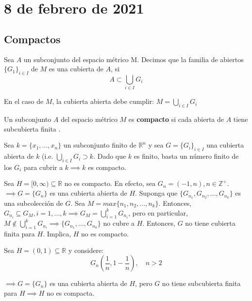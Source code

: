 \section{8 de febrero de 2021}

\subsection{Compactos}
\begin{definition}
Sea $A$ un subconjunto del espacio métrico M. Decimos que la familia de abiertos $\{G_1\}_{i\in I}$ de $M$ es una cubierta de $A$, si
$$A\subset \bigcup_{i\in I}G_i $$
\end{definition}
\begin{remark}
En el caso de $M$, la cubierta abierta debe cumplir: $M=\bigcup_{i\in I}G_i$
\end{remark}

\begin{definition}
Un subconjunto $A$ del espacio métrico $M$ es \textbf{compacto} si cada abierta de $A$ tiene subcubierta finita . 
\end{definition}

\begin{example}
Sea $k=\{x_1,...,x_n\}$ un subconjunto finito de $\mathbb{R}^n$ y sea $G=\{G_i\}_{i\in I}$ una cubierta abierta de $k$ (i.e. $\bigcup_{i\in I}G_i\supset k$. Dado que $k$ es finito, basta un número finito de los $G_i$ para cubrir a $k\implies k$ es compacto. 
\end{example}
\begin{example}
Sea $H=[0,\infty)\subseteq \mathbb{R}$ no es compacto. En efecto, sea $G_n =(-1,n), n\in\mathbb{Z}^+$.\newline\newline 
$\implies G=\{G_n\}$ es una cubierta abierta de $H$. Suponga que $\{G_{n_1},G_{n_2},...,G_{n_k}\}$ es una subcolección de $G$. Sea $M=max\{n_1,n_2,...,n_k\}$. Entonces, $G_{n_i}\subseteq G_M, i=1,...,k\implies G_M=\bigcup_{i=1}^k G_{n_i}$, pero en particular, $M\not\in \bigcup_{i=1}^k G_{n_i}\implies \{G_{n_1},...,G_{n_k}\}$ no cubre a $H$. Entonces, $G$ no tiene cubierta finita para $H$. Implica, $H$ no es compacto. 
\end{example}

\begin{example}
Sea $H=(0,1)\subseteq \mathbb{R}$ y considere:
$$G_n(\frac{1}{n},1-\frac{1}{n}), \quad n>2$$

$\implies G=\{G_n\}$ es una cubierta abierta de $H$, pero $G$ no tiene subcubierta finita para $H\implies H$ no es compacta. 
\end{example}

